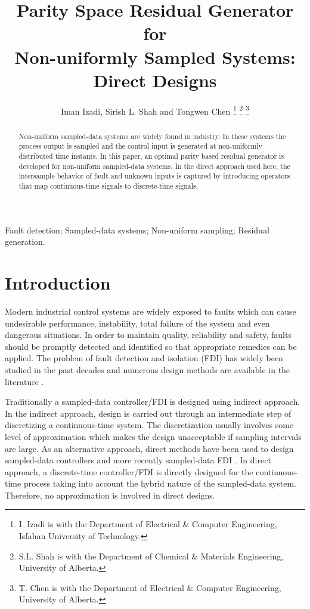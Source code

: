 \documentclass[A4paper,conference]{IEEEtran}
\title{Parity Space Residual Generator for \\ Non-uniformly Sampled Systems: Direct Designs}
\date{}
\author{Iman Izadi, Sirish L. Shah and Tongwen Chen
\thanks{I. Izadi is with the Department of Electrical \& Computer Engineering,
Isfahan University of Technology.}
\thanks{S.L. Shah is with the Department of Chemical \& Materials Engineering,
University of Alberta.}
\thanks{T. Chen is with the Department of Electrical \& Computer Engineering,
University of Alberta.}}
\begin{document}
\maketitle

\begin{abstract}

Non-uniform sampled-data systems are widely found in industry. In
these systems the process output is sampled and the control input is
generated at non-uniformly distributed time instants. In this paper,
an optimal parity based residual generator is developed for
non-uniform sampled-data systems. In the direct approach used here,
the intersample behavior of fault and unknown inputs is captured by
introducing operators that map continuous-time signals to
discrete-time signals.

\end{abstract}

\begin{keywords}
Fault detection; Sampled-data systems; Non-uniform sampling; Residual generation.
\end{keywords}

\section{Introduction}\label{sec1}
Modern industrial control systems are widely exposed to faults which
can cause undesirable performance, instability, total failure of the
system and even dangerous situations. In order to maintain quality,
reliability and safety, faults should be promptly detected and
identified so that appropriate remedies can be applied. The problem
of fault detection and isolation (FDI) has widely been studied in
the past decades and numerous design methods are available in the
literature \cite{ChenPatton,Isermann}.

Traditionally a sampled-data controller/FDI is designed using
indirect approach. In the indirect approach, design is carried out
through an intermediate step of discretizing a continuous-time
system. The discretization usually involves some level of
approximation which makes the design unacceptable if sampling
intervals are large. As an alternative approach, direct methods have
been used to design sampled-data controllers and more recently
sampled-data FDI \cite{Chen,Izadi2,Zhang01a}. In direct
approach, a discrete-time controller/FDI is directly designed for
the continuous-time process taking into account the hybrid nature of
the sampled-data system. Therefore, no approximation is involved in
direct designs.
\end{document}

